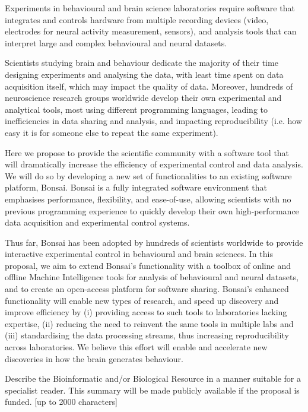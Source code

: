 Experiments in behavioural and brain science laboratories require software that integrates and controls hardware from multiple recording devices (video, electrodes for neural activity measurement, sensors), and analysis tools that can interpret large and complex behavioural and neural datasets. 

Scientists studying brain and behaviour dedicate the majority of their time designing experiments and analysing the data, with least time spent on data acquisition itself, which may impact the quality of data. Moreover, hundreds of neuroscience research groups worldwide develop their own experimental and analytical tools, most using different programming languages, leading to  inefficiencies in data sharing and analysis, and impacting reproducibility (i.e. how easy it is for someone else to repeat the same experiment). 

Here we propose to provide the scientific community with a software tool that will dramatically increase the efficiency of experimental control and data analysis. We will do so by developing a new set of functionalities to an existing software platform, Bonsai. Bonsai is a fully integrated software environment that emphasises performance, flexibility, and ease-of-use, allowing scientists with no previous programming experience to quickly develop their own high-performance data acquisition and experimental control systems.

Thus far, Bonsai has been adopted by hundreds of scientists worldwide to provide interactive experimental control in behavioural and brain sciences. In this proposal, we aim to extend Bonsai’s functionality with a toolbox of online and offline Machine Intelligence tools for analysis of behavioural and neural datasets, and to create an open-access platform for software sharing. Bonsai’s enhanced functionality will enable new types of research, and speed up discovery and improve efficiency by (i) providing access to such tools to laboratories lacking expertise, (ii) reducing the need to reinvent the same tools in multiple labs and (iii) standardising the data processing streams, thus increasing reproducibility across laboratories. We believe this effort will enable and accelerate new discoveries in how the brain generates behaviour. 



Describe the Bioinformatic and/or Biological Resource in a manner suitable for a specialist reader. This summary will be made publicly available if the proposal is funded. [up to 2000 characters]

